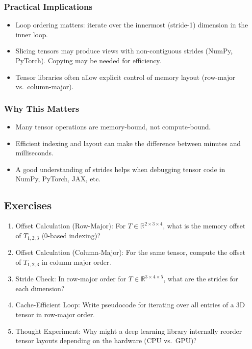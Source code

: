 \documentclass[
  letterpaper,
  DIV=11,
  numbers=noendperiod]{scrreprt}
\providecommand{\tightlist}{%
  \setlength{\itemsep}{0pt}\setlength{\parskip}{0pt}}
\begin{document}
\subsubsection{Practical Implications}\label{practical-implications}

\begin{itemize}
\tightlist
\item
  Loop ordering matters: iterate over the innermost (stride-1) dimension
  in the inner loop.
\item
  Slicing tensors may produce views with non-contiguous strides (NumPy,
  PyTorch). Copying may be needed for efficiency.
\item
  Tensor libraries often allow explicit control of memory layout
  (row-major vs.~column-major).
\end{itemize}

\subsubsection{Why This Matters}\label{why-this-matters-39}

\begin{itemize}
\tightlist
\item
  Many tensor operations are memory-bound, not compute-bound.
\item
  Efficient indexing and layout can make the difference between minutes
  and milliseconds.
\item
  A good understanding of strides helps when debugging tensor code in
  NumPy, PyTorch, JAX, etc.
\end{itemize}

\subsection{Exercises}\label{exercises-53}

\begin{enumerate}
\def\labelenumi{\arabic{enumi}.}
\item
  Offset Calculation (Row-Major): For
  \(T \in \mathbb{R}^{2 \times 3 \times 4}\), what is the memory offset
  of \(T_{1,2,3}\) (0-based indexing)?
\item
  Offset Calculation (Column-Major): For the same tensor, compute the
  offset of \(T_{1,2,3}\) in column-major order.
\item
  Stride Check: In row-major order for
  \(T \in \mathbb{R}^{3 \times 4 \times 5}\), what are the strides for
  each dimension?
\item
  Cache-Efficient Loop: Write pseudocode for iterating over all entries
  of a 3D tensor in row-major order.
\item
  Thought Experiment: Why might a deep learning library internally
  reorder tensor layouts depending on the hardware (CPU vs.~GPU)?
\end{enumerate}
\end{document}
